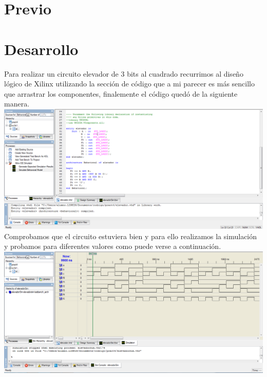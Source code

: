 \documentclass{mylib/reporteConCalif}
\begin{document}

\newpage
\section{Previo}

\newpage
\section{Desarrollo}

Para realizar un circuito elevador de 3 bits al cuadrado recurrimos al diseño lógico de Xilinx utilizando la sección de código que a mi parecer es más sencillo que arrastrar los componentes, finalemente el código quedó de la siguiente manera.\\

\includegraphics[width=15cm]{img/labdise_pract4/r4_img1}\\

Comprobamos que el circuito estuviera bien y para ello realizamos la simulación y probamos para diferentes valores como puede verse a continuación.\\

\includegraphics[width=15cm]{img/labdise_pract4/r4_img2}\\
\end{document}
